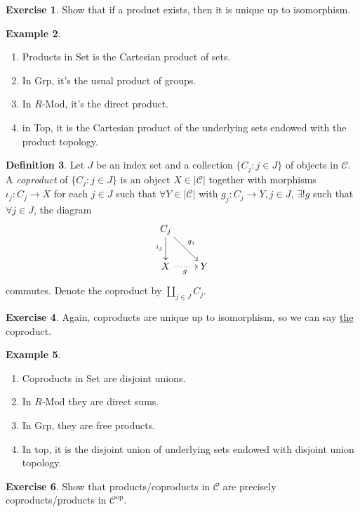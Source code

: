 \documentclass{article}
\newcommand{\op}{{\operatorname{op}}}
\newcommand{\ca}{\mathcal{C}}
\theoremstyle{definition}
\newtheorem{defn}{Definition}[subsection]
\newtheorem{example}[defn]{Example}
\newtheorem{exe}[defn]{Exercise}
\begin{document}
\begin{exe}
Show that if a product exists, then it is unique up to isomorphism.
\end{exe}

\begin{example}
\begin{enumerate}
\item Products in Set is the Cartesian product of sets.
\item In Grp, it's the usual product of groups.
\item In $R$-Mod, it's the direct product.
\item in Top, it is the Cartesian product of the underlying sets endowed with the product topology.
\end{enumerate}
\end{example}

\begin{defn}
Let $J$ be an index set and a collection $\{C_j:j\in J\}$ of objects in $\ca$. A \textit{coproduct} of $\{C_j:j\in J\}$ is an object $X\in|\ca|$ together with morphisms $\iota_j:C_j\rightarrow X$ for each $j\in J$ such that $\forall Y\in|\ca|$ with $g_j:C_j\rightarrow Y,j\in J$, $\exists! g$ such that $\forall j\in J$, the diagram
\[
\xymatrix{C_j\ar[d]_{\iota_j} \ar[dr]^{g_j}\\ X\ar@{.>}[r]_g& Y}
\]
commutes. Denote the coproduct by $\coprod_{j\in J}C_j$.
\end{defn}

\begin{exe}
Again, coproducts are unique up to isomorphism, so we can say \underline{the} coproduct.
\end{exe}

\begin{example}
\begin{enumerate}
\item Coproducts in Set are disjoint unions.
\item In $R$-Mod they are direct sums.
\item In Grp, they are free products.
\item In top, it is the disjoint union of underlying sets endowed with disjoint union topology.
\end{enumerate}
\end{example}

\begin{exe}
Show that products/coproducts in $\ca$ are precisely coproducts/products in $\ca^\op$.
\end{exe}
\end{document}
